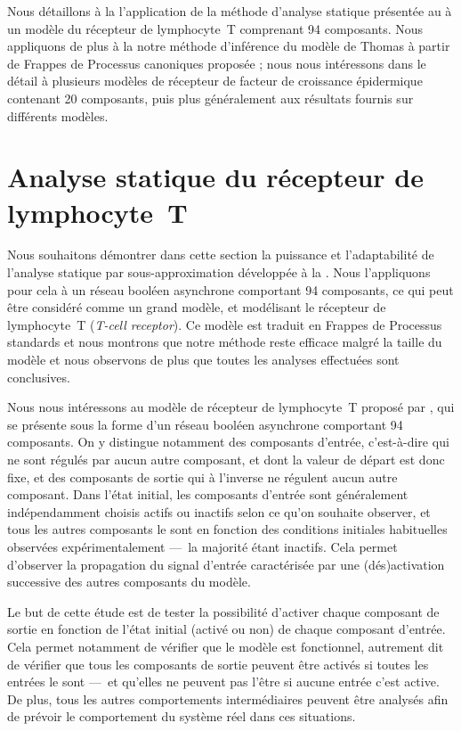 \myskip

Nous détaillons à la  l'application de la méthode
d'analyse statique présentée
au  à un modèle du récepteur de lymphocyte~T comprenant 94 composants.
Nous appliquons de plus à la  notre méthode d'inférence
du modèle de Thomas à partir de Frappes de Processus canoniques proposée  ;
nous nous intéressons dans le détail à plusieurs modèles
de récepteur de facteur de croissance épidermique contenant 20 composants,
puis plus généralement aux résultats fournis sur différents modèles.



\section{Analyse statique du récepteur de lymphocyte~T}

Nous souhaitons démontrer dans cette section la puissance et l'adaptabilité
de l'analyse statique par sous-approximation développée à la .
Nous l'appliquons pour cela à un réseau booléen asynchrone
comportant 94 composants, ce qui peut être considéré comme un grand modèle,
et modélisant le récepteur de lymphocyte~T (\textit{T-cell receptor}).
Ce modèle est traduit en Frappes de Processus standards
et nous montrons que notre méthode reste efficace malgré la taille du modèle
et nous observons de plus que toutes les analyses effectuées sont conclusives.

\myskip

Nous nous intéressons au modèle de récepteur de lymphocyte~T
proposé par ,
qui se présente sous la forme d'un réseau booléen asynchrone comportant 94 composants.
On y distingue notamment des composants d'entrée, c'est-à-dire qui ne sont régulés
par aucun autre composant, et dont la valeur de départ est donc fixe,
et des composants de sortie qui à l'inverse ne régulent aucun autre composant.
Dans l'état initial, les composants d'entrée sont généralement
indépendamment choisis actifs ou inactifs selon ce qu'on souhaite observer,
et tous les autres composants le sont en fonction des conditions initiales habituelles
observées expérimentalement ---~la majorité étant inactifs.
Cela permet d'observer la propagation du signal d'entrée caractérisée par une (dés)activation
successive des autres composants du modèle.

Le but de cette étude est de tester la possibilité d'activer chaque composant de sortie
en fonction de l'état initial (activé ou non) de chaque composant d'entrée.
Cela permet notamment de vérifier que le modèle est fonctionnel,
autrement dit de vérifier que
tous les composants de sortie peuvent être activés si toutes les entrées le sont
---~et qu'elles ne peuvent pas l'être si aucune entrée c'est active.
De plus, tous les autres comportements intermédiaires peuvent être analysés
afin de prévoir le comportement du système réel dans ces situations.

